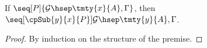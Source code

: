 \begin{lemma}\label{lem:hccp-preservation-subst}
  If $\seq[P]{\mathcal{G} \hsep \tmty{x}{A}, \Gamma}$,
  then $\seq[\cpSub{y}{x}{P}]{\mathcal{G} \hsep \tmty{y}{A}, \Gamma}$.
\end{lemma}
\begin{proof}
  By induction on the structure of the premise.
\end{proof}
